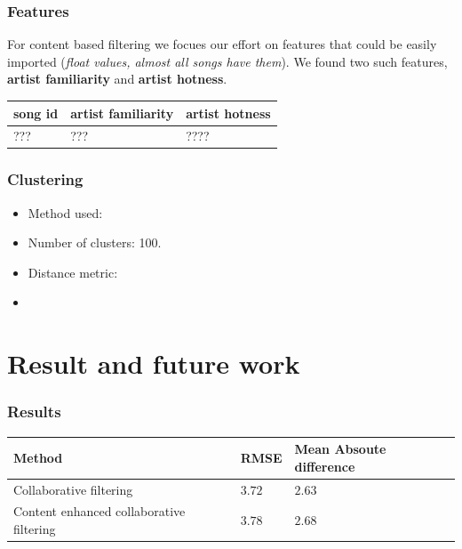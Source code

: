 \documentclass[11pt]{beamer}
\begin{document}
  \begin{frame}
    \frametitle{Features}
    For content based filtering we focues our effort on features that could be easily imported ({\it float values, almost all songs have them}). We found two such features,
    {\bf artist familiarity} and {\bf artist hotness}.
    \begin{table}
      \begin{tabular}{|l|l l|}
        \hline
        {\bf song id} & {\bf artist familiarity} & {\bf artist hotness}\\
        \hline
        \hline
        ??? & ??? & ????\\
        \hline
      \end{tabular}
    \end{table}
  \end{frame}

  \begin{frame}
    \frametitle{Clustering}
    \begin{itemize}
      \item Method used:
      \item Number of clusters: 100. 
      \item Distance metric:
      \item
    \end{itemize}
  \end{frame}


  \section{Result and future work}
  \begin{frame}
    \frametitle{Results}
    \begin{table}
      \begin{tabular}{|p{5cm}|p{3cm} p{3cm}|}
        \hline
        {\bf Method} & {\bf RMSE} & {\bf Mean Absoute difference} \\
        \hline
        \hline
        {\color{red} Collaborative filtering} & {\color{red}$3.72$} & {\color{red}$2.63$}\\
        {\color{blue}Content enhanced collaborative filtering} & {\color{blue}$3.78$} & {\color{blue}$2.68$}\\
        \hline
      \end{tabular}
    \end{table}
  \end{frame}
\end{document}
